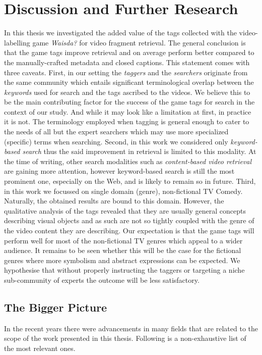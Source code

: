 \section{Discussion and Further Research}
In this thesis we investigated the added value of the tags collected with the video-labelling game \textit{Waisda?} for video fragment retrieval. The general conclusion is that the game tags improve retrieval and on average perform better compared to the manually-crafted metadata and closed captions. This statement comes with three caveats. First, in our setting the \textit{taggers} and the \textit{searchers} originate from the same community which entails significant terminological overlap between the \textit{keywords} used for search and the tags ascribed to the videos. We believe this to be the main contributing factor for the success of the game tags for search in the context of our study. And while it may look like a limitation at first, in practice it is not. The terminology employed when tagging is general enough to cater to the needs of all but the expert searchers which may use more specialized (specific) terms when searching. Second, in this work we considered only \textit{keyword-based search} thus the said improvement in retrieval is limited to this modality. At the time of writing, other search modalities such as \textit{content-based video retrieval} \cite{veltkamp2013state} are gaining more attention, however keyword-based search is still the most prominent one, especially on the Web, and is likely to remain so in future. Third, in this work we focussed on single domain (genre), non-fictional TV Comedy. Naturally, the obtained results are bound to this domain. However, the qualitative analysis of the tags revealed that they are usually general concepts describing visual objects and as such are not so tightly coupled with the genre of the video content they are describing. Our expectation is that the game tags will perform well for most of the non-fictional TV genres which appeal to a wider audience. It remains to be seen whether this will be the case for the fictional genres where more symbolism and abstract expressions can be expected. We hypothesise that without properly instructing the taggers or targeting a niche sub-community of experts the outcome will be less satisfactory.

\subsection{The Bigger Picture}\label{con:bigger-picture}
In the recent years there were advancements in many fields that are related to the scope of the work presented in this thesis. Following is a non-exhaustive list of the most relevant ones.

